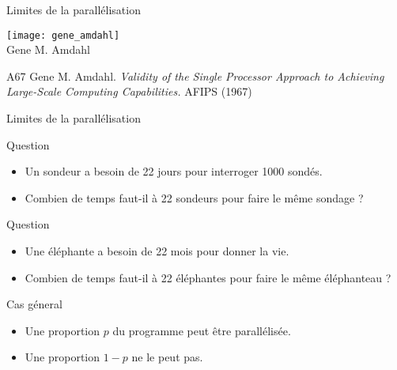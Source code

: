 \mode*

\begin{frame}{Limites de la parallélisation}
  \vFill
  \begin{center}
      \texttt{[image: gene\_amdahl]}\\
      Gene M. Amdahl
    \end{center}
  \vFill
  \begin{citing}
  \item[A67] Gene M. Amdahl. \textit{Validity of the Single Processor Approach to Achieving Large-Scale Computing Capabilities.} AFIPS (1967)
  \end{citing}
\end{frame}
 
\begin{frame}{Limites de la parallélisation}
  \begin{alertblock}{Question}
    \begin{itemize}
    \item Un sondeur a besoin de 22 jours pour interroger 1000 sondés.
    \item Combien de temps faut-il à 22 sondeurs pour faire le même sondage ?
    \end{itemize}
  \end{alertblock}
  \pause
  \begin{alertblock}{Question}
    \begin{itemize}
    \item Une éléphante a besoin de 22 mois pour donner la vie.
    \item Combien de temps faut-il à 22 éléphantes pour faire le même éléphanteau ?
    \end{itemize}
  \end{alertblock}
  \pause
  \begin{block}{Cas géneral}
    \begin{itemize}
    \item Une proportion $p$ du programme peut être parallélisée.
    \item Une proportion $1-p$ ne le peut pas.
    \end{itemize}
  \end{block}
\end{frame}
 
